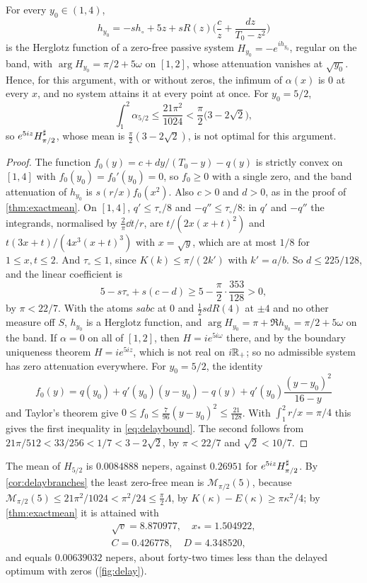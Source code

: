 \begin{theorem}\label{thm:delay}
For every $y_0\in(1,4)$,
\[
h_{y_0}=-sh_\circ+5z+sR(z)\Big(\frac cz+\frac{dz}{T_0-z^2}\Big)
\]
is the Herglotz function of a zero-free passive system $H_{y_0}=-e^{ih_{y_0}}$,
regular on the band, with $\arg H_{y_0}=\pi/2+5\omega$ on $[1,2]$, whose
attenuation vanishes at $\sqrt{y_0}$. Hence, for this argument, with or
without zeros, the infimum of $\alpha(x)$ is $0$ at every $x$, and no
system attains it at every point at once. For $y_0=5/2$,
\begin{equation}\label{eq:delaybound}
\int_1^2\alpha_{5/2}\le\frac{21\pi^2}{1024}<\frac\pi2\big(3-2\sqrt2\big),
\end{equation}
so $e^{5iz}H^{\sharp}_{\pi/2}$, whose mean is $\frac\pi2(3-2\sqrt2)$, is not optimal
for this argument.
\end{theorem}

\begin{proof}
The function $f_0(y)=c+dy/(T_0-y)-q(y)$ is strictly convex on $[1,4]$ with
$f_0(y_0)=f_0'(y_0)=0$, so $f_0\ge0$ with a single zero, and the band
attenuation of $h_{y_0}$ is $s(r/x)f_0(x^2)$. Also $c>0$ and $d>0$, as in the
proof of \cref{thm:exactmean}. On $[1,4]$, $q'\le\tau_\circ/8$ and
$-q''\le\tau_\circ/8$: in $q'$ and $-q''$ the integrands, normalised by
$\frac2\pi\dd t/r$, are $t/(2x(x+t)^2)$ and $t(3x+t)/(4x^3(x+t)^3)$ with
$x=\sqrt y$, which are at most $1/8$ for $1\le x,t\le2$. And $\tau_\circ\le1$,
since $K(k)\le\pi/(2k')$ with $k'=a/b$. So $d\le225/128$, and the linear
coefficient is
\[
5-s\tau_\circ+s(c-d)\ge5-\frac\pi2\cdot\frac{353}{128}>0,
\]
by $\pi<22/7$. With the atoms $sabc$ at $0$ and $\frac12sdR(4)$ at $\pm4$ and
no other measure off $S$, $h_{y_0}$ is a Herglotz function, and $\arg
H_{y_0}=\pi+\Re h_{y_0}=\pi/2+5\omega$ on the band. If $\alpha=0$ on all of
$[1,2]$, then $H=ie^{5i\omega}$ there, and by the boundary uniqueness theorem
\cite[Ch.~II]{garnett} $H=ie^{5iz}$, which is not real on $i\mathbb R_+$; so no
admissible system has zero attenuation everywhere. For $y_0=5/2$, the
identity
\[
f_0(y)=q(y_0)+q'(y_0)(y-y_0)-q(y)+q'(y_0)\frac{(y-y_0)^2}{16-y}
\]
and Taylor's theorem give $0\le f_0\le\frac7{96}(y-y_0)^2\le\frac{21}{128}$.
With $\int_1^2r/x=\pi/4$ this gives the first inequality in
\eqref{eq:delaybound}. The second follows from
$21\pi/512<33/256<1/7<3-2\sqrt2$, by $\pi<22/7$ and $\sqrt2<10/7$.
\end{proof}

The mean of $H_{5/2}$ is $0.0084888$ nepers, against $0.26951$ for
$e^{5iz}H^{\sharp}_{\pi/2}$. By \cref{cor:delaybranches} the least zero-free mean is
$\mathcal M_{\pi/2}(5)$, because $\mathcal M_{\pi/2}(5)\le21\pi^2/1024<\pi^2/24\le\frac\pi2\Lambda$,
by $K(\kappa)-E(\kappa)\ge\pi\kappa^2/4$; by \cref{thm:exactmean} it is attained with
\begin{gather*}
\sqrt v=8.870977,\quad x_*=1.504922,\\
C=0.426778,\quad D=4.348520,
\end{gather*}
and equals $0.00639032$ nepers, about forty-two times less than the
delayed optimum with zeros (\cref{fig:delay}).

